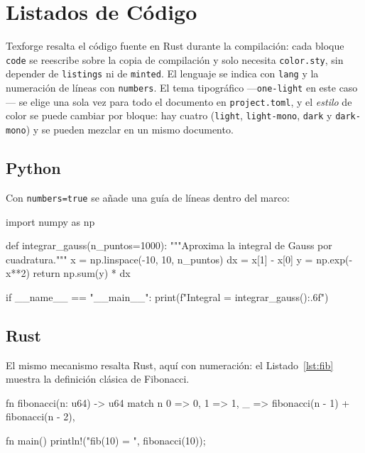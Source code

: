 \section{Listados de Código}\label{sec:codigo}

Texforge resalta el código fuente en Rust durante la compilación: cada
bloque \texttt{code} se reescribe sobre la copia de compilación y solo
necesita \texttt{color.sty}, sin depender de \texttt{listings} ni de
\texttt{minted}. El lenguaje se indica con \texttt{lang} y la numeración de
líneas con \texttt{numbers}. El tema tipográfico ---\texttt{one-light} en
este caso--- se elige una sola vez para todo el documento en
\texttt{project.toml}, y el \emph{estilo} de color se puede cambiar por
bloque: hay cuatro (\texttt{light}, \texttt{light-mono}, \texttt{dark} y
\texttt{dark-mono}) y se pueden mezclar en un mismo documento.

\subsection{Python}

Con \texttt{numbers=true} se añade una guía de líneas dentro del marco:

\begin{code}[lang=python, numbers=true]
import numpy as np

def integrar_gauss(n_puntos=1000):
    """Aproxima la integral de Gauss por cuadratura."""
    x = np.linspace(-10, 10, n_puntos)
    dx = x[1] - x[0]
    y = np.exp(-x**2)
    return np.sum(y) * dx

if __name__ == "__main__":
    print(f"Integral = {integrar_gauss():.6f}")
\end{code}

\subsection{Rust}

El mismo mecanismo resalta Rust, aquí con numeración: el
Listado~\ref{lst:fib} muestra la definición clásica de Fibonacci.

\begin{code}[lang=rust, numbers=true, caption={Fibonacci en Rust}, label={lst:fib}]
fn fibonacci(n: u64) -> u64 {
    match n {
        0 => 0,
        1 => 1,
        _ => fibonacci(n - 1) + fibonacci(n - 2),
    }
}

fn main() {
    println!("fib(10) = {}", fibonacci(10));
}
\end{code}

